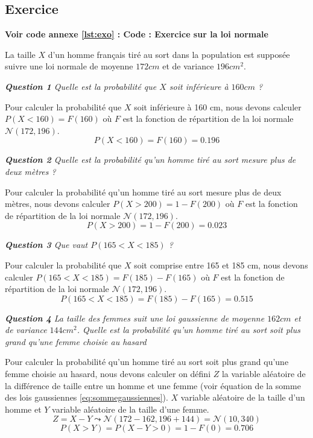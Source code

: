     \subsection{Exercice}
        \noindent \textbf{Voir code annexe \ref{lst:exo} : Code : Exercice sur la loi normale}

        La taille $X$ d’un homme français tiré au sort dans la population est supposée suivre une loi normale de moyenne $172cm$ et de variance $196cm^2$.
        \begin{center}
            \textit{\textbf{Question 1} Quelle est la probabilité que $X$ soit inférieure à $160cm$ ?}
        \end{center}
        Pour calculer la probabilité que $X$ soit inférieure à 160 cm, nous devons calculer $P(X<160) = F(160)$ où $F$ est la fonction de répartition de la loi normale $\mathcal N(172,196)$.
        \[
            P(X<160) = F(160) = 0.196
        \]
        \begin{center}
            \textit{\textbf{Question 2} Quelle est la probabilité qu’un homme tiré au sort mesure plus de deux mètres ?}
        \end{center}
        Pour calculer la probabilité qu’un homme tiré au sort mesure plus de deux mètres, nous devons calculer $P(X>200) = 1-F(200)$ où $F$ est la fonction de répartition de la loi normale $\mathcal N(172,196)$.
        \[
            P(X>200) = 1-F(200) = 0.023
        \]
        \begin{center}
            \textit{\textbf{Question 3} Que vaut $P(165 < X < 185)$ ?}
        \end{center}
        Pour calculer la probabilité que $X$ soit comprise entre 165 et 185 cm, nous devons calculer $P(165<X<185) = F(185)-F(165)$ où $F$ est la fonction de répartition de la loi normale $\mathcal N(172,196)$.
        \[
            P(165<X<185) = F(185)-F(165) = 0.515
        \]

        \begin{center}
            \textit{\textbf{Question 4} La taille des femmes suit une loi gaussienne de moyenne $162cm$ et de variance $144cm^2$. Quelle est la probabilité qu’un homme tiré au sort soit plus grand qu’une femme choisie au hasard}
        \end{center}

        Pour calculer la probabilité qu’un homme tiré au sort soit plus grand qu’une femme choisie au hasard, nous devons calculer on défini $Z$ la variable aléatoire de la différence de taille entre un homme et une femme (voir équation de la somme des lois gaussiennes \ref{eq:sommegaussiennes}). 
        $X$ variable aléatoire de la taille d'un homme et $Y$ variable aléatoire de la taille d'une femme.
        \[
            Z = X - Y \leadsto \mathcal N(172-162,196+144) = \mathcal N(10,340)
        \]
        \[
            P(X>Y) = P(X-Y>0) = 1-F(0) = 0.706
        \]



